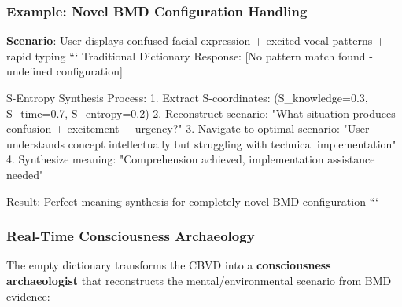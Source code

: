 \documentclass[12pt,a4paper]{article}
\begin{document}
\subsubsection{Example: Novel BMD Configuration Handling}

\textbf{Scenario}: User displays confused facial expression + excited vocal patterns + rapid typing
```
Traditional Dictionary Response: [No pattern match found - undefined configuration]

S-Entropy Synthesis Process:
1. Extract S-coordinates: (S_knowledge=0.3, S_time=0.7, S_entropy=0.2)
2. Reconstruct scenario: "What situation produces confusion + excitement + urgency?"
3. Navigate to optimal scenario: "User understands concept intellectually but struggling with technical implementation"
4. Synthesize meaning: "Comprehension achieved, implementation assistance needed"

Result: Perfect meaning synthesis for completely novel BMD configuration
```

\subsubsection{Real-Time Consciousness Archaeology}

The empty dictionary transforms the CBVD into a \textbf{consciousness archaeologist} that reconstructs the mental/environmental scenario from BMD evidence:
\end{document}
